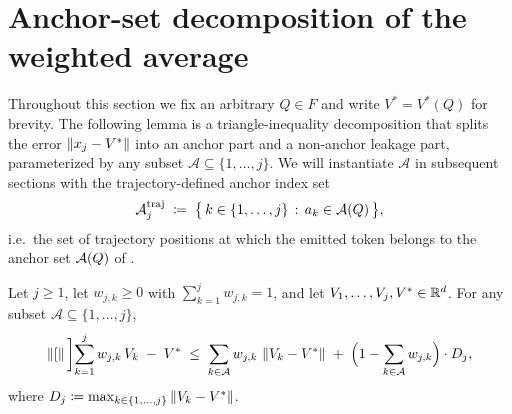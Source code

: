 \section{Anchor-set decomposition of the weighted average}
\label{sec:anchor_decomposition}

Throughout this section we fix an arbitrary $Q \in F$ and write $V^* = V^*(Q)$
for brevity. The following lemma is a triangle-inequality decomposition that
splits the error $\left\| x_j - V^* \right\|$ into an anchor part and a non-anchor
leakage part, parameterized by any subset $\mathcal A \subseteq \{1, \dots, j\}$.
We will instantiate $\mathcal A$ in subsequent sections with the
trajectory-defined anchor index set
\begin{align}\label{eq:anchor_index_set}
   \mathcal A^{\mathrm{traj}}_j \;\coloneqq\;
      \big\{ \, k \in \{1, \dots, j\} \,:\, a_k \in \mathcal{A}(Q) \, \big\},
\end{align}
i.e.\ the set of trajectory positions at which the emitted token belongs
to the anchor set $\mathcal{A}(Q)$ of .

\begin{lemma}\label{lem:anchor_decomposition}
Let $j \ge 1$, let $w_{j,k} \ge 0$ with $\sum_{k=1}^{j} w_{j,k} = 1$, and
let $V_1, \dots, V_j, V^* \in \mathbb{R}^d$. For any subset
$\mathcal A \subseteq \{1, \dots, j\}$,
\begin{align}\label{eq:anchor_decomp_bound}
   \left\| [ \right\|\bigg]{\sum_{k=1}^{j} w_{j,k}\, V_k \;-\; V^*}
   \;\le\;
   \sum_{k \in \mathcal A} w_{j,k}\, \left\| V_k - V^* \right\|
   \;+\;
   \Big( 1 - \sum_{k \in \mathcal A} w_{j,k} \Big) \cdot D_j,
\end{align}
where $D_j \coloneqq \max_{k \in \{1, \dots, j\}} \left\| V_k - V^* \right\|$.
\end{lemma}

